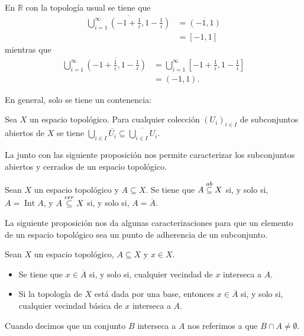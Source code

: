 \begin{Ejm}
   En $\mathbb{R}$ con la topología usual se tiene que
   $$
   \begin{aligned}
      \overline{\bigcup_{i=1}^{\infty}\left(-1+\frac{1}{i},1-\frac{1}{i}\right)} &= \overline{(-1,1)}\\
         &=[-1,1]
   \end{aligned}
   $$
   mientras que
   $$
   \begin{aligned}
      \bigcup_{i=1}^{\infty}\overline{\left( -1+\frac{1}{i},1-\frac{1}{i}\right)} &= \bigcup_{i=1}^{\infty}\left[-1+\frac{1}{i},1-\frac{1}{i}\right]\\
          &= (-1,1).
   \end{aligned}
   $$
\end{Ejm}
En general, solo se tiene un contenencia:
\begin{Prop}\label{Prop:Clausura_uniones_finitas}
   Sea $X$ un espacio topológico. Para cualquier colección $\left( U_i\right)_{i\in I}$ de subconjuntos abiertos de $X$ se tiene $\bigcup_{i\in I}\overline{U_i}\subseteq \overline{\bigcup_{i\in I}U_i}$.
\end{Prop}
La  junto con las siguiente proposición nos permite caracterizar los subconjuntos abiertos y cerrados de un espacio topológico.
\begin{Prop}\label{Prop:Carac_abierto_cerrado}
   Sean $X$ un espacio topológico y $A\subseteq X$. Se tiene que $A\stackrel{ab}{\subseteq} X$ si, y solo si, $A=\operatorname{Int}A$, y $A\stackrel{cer}{\subseteq} X$ si, y solo si, $A=\overline{A}$. 
\end{Prop}
La siguiente proposición nos da algunas caracterizaciones para que un elemento de un espacio topológico sea un punto de adherencia de un subconjunto.
\begin{Prop}\label{Prop:Caracterizacion_punto_adherencia}
   Sean $X$ un espacio topológico, $A\subseteq X$ y $x\in X$.
   \begin{itemize}
      \item[1.] Se tiene que $x\in \overline{A}$ si, y solo si, cualquier vecindad de $x$ interseca a $A$.
      \item[2.] Si la topología de $X$ está dada por una base, entonces $x\in\overline{A}$ si, y solo si, cualquier vecindad básica de $x$ interseca a $A$. 
   \end{itemize}
\end{Prop}
Cuando decimos que un conjunto $B$ interseca a $A$ nos referimos a que $B\cap A\neq \emptyset$.
